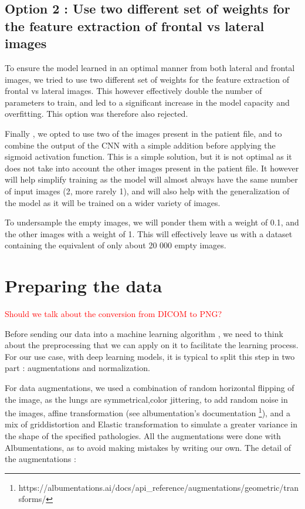 \documentclass[11pt]{article}
\newcommand\myworries[1]{\textcolor{red}{#1}}
\begin{document}
    \subsection{Option 2 : Use two different set of weights for the feature extraction of frontal vs lateral images}

        To ensure the model learned in an optimal manner from both lateral and frontal images, we tried to use two different set of weights for the feature extraction of frontal vs lateral images. This however
        effectively double the number of parameters to train, and led to a significant increase in the model capacity and overfitting. This option was therefore also rejected.

    Finally , we opted to use two of the images present in the patient file, and to combine the output of the CNN with a simple addition before applying the sigmoid activation function. This is a simple solution, but it is not optimal as it does not take into account the other images present in the patient file.
    It however will help simplify training as the model will almost always have the same number of input images (2, more rarely 1), and will also help with the generalization of the model as it will be trained on a wider variety of images.

    To undersample the empty images, we will ponder them with a weight of 0.1, and the other images with a weight of 1. This will effectively leave us with a dataset containing the equivalent of only about 20 000 empty images.


    \section{Preparing the data}

    \myworries{Should we talk about the conversion from DICOM to PNG?}

    Before sending our data into a machine learning algorithm , we need to think about the preprocessing that we can
    apply on it to facilitate the learning process. For our use case, with deep learning models, it is typical to
    split this step in two part : augmentations and normalization.


    For data augmentations, we used a combination of random horizontal flipping of the image, as the lungs are symmetrical,color jittering, to add random noise
    in the images, affine transformation (see albumentation's documentation \footnote{https://albumentations.ai/docs/api_reference/augmentations/geometric/transforms/}), and a mix of griddistortion and Elastic transformation to simulate a greater
    variance in the shape of the specified pathologies. All the augmentations were done with Albumentations, as to avoid making mistakes
    by writing our own\cite{albumentations}. The detail of the augmentations :
\end{document}
